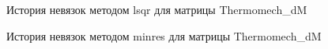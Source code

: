 \begin{figure}[H]
    \renewcommand{\figurename}{Рисунок}
    \caption{История невязок методом lsqr для матрицы Thermomech\_dM}
    \label{fig:image_27}
\end{figure}

\begin{figure}[H]
    \renewcommand{\figurename}{Рисунок}
    \caption{История невязок методом minres для матрицы Thermomech\_dM}
    \label{fig:image_28}
\end{figure}

